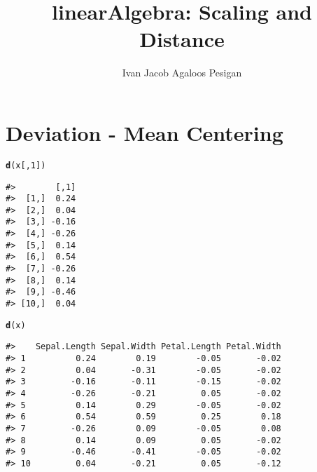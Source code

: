 \documentclass{article}\usepackage[]{graphicx}\usepackage[]{color}
\title{linearAlgebra: Scaling and Distance}
\author{Ivan Jacob Agaloos Pesigan}
\date{}
\makeatletter
\newcommand{\hlnum}[1]{\textcolor[rgb]{0.686,0.059,0.569}{#1}}%
\newcommand{\hlstd}[1]{\textcolor[rgb]{0.345,0.345,0.345}{#1}}%
\newcommand{\hlkwd}[1]{\textcolor[rgb]{0.737,0.353,0.396}{\textbf{#1}}}%
\newenvironment{kframe}{%
 \def\at@end@of@kframe{}%
 \ifinner\ifhmode%
  \def\at@end@of@kframe{\end{minipage}}%
  \begin{minipage}{\columnwidth}%
 \fi\fi%
 \def\FrameCommand##1{\hskip\@totalleftmargin \hskip-\fboxsep
 \colorbox{shadecolor}{##1}\hskip-\fboxsep
     \hskip-\linewidth \hskip-\@totalleftmargin \hskip\columnwidth}%
 \MakeFramed {\advance\hsize-\width
   \@totalleftmargin\z@ \linewidth\hsize
   \@setminipage}}%
 {\par\unskip\endMakeFramed%
 \at@end@of@kframe}
\newenvironment{knitrout}{}{} %
\makeatother
\begin{document}
\maketitle





\section*{Deviation - Mean Centering}









\begin{knitrout}
\color{fgcolor}\begin{kframe}
\begin{alltt}
\hlkwd{d}\hlstd{(x[,} \hlnum{1}\hlstd{])}
\end{alltt}
\begin{verbatim}
#>        [,1]
#>  [1,]  0.24
#>  [2,]  0.04
#>  [3,] -0.16
#>  [4,] -0.26
#>  [5,]  0.14
#>  [6,]  0.54
#>  [7,] -0.26
#>  [8,]  0.14
#>  [9,] -0.46
#> [10,]  0.04
\end{verbatim}
\end{kframe}
\end{knitrout}







\begin{knitrout}
\color{fgcolor}\begin{kframe}
\begin{alltt}
\hlkwd{d}\hlstd{(x)}
\end{alltt}
\begin{verbatim}
#>    Sepal.Length Sepal.Width Petal.Length Petal.Width
#> 1          0.24        0.19        -0.05       -0.02
#> 2          0.04       -0.31        -0.05       -0.02
#> 3         -0.16       -0.11        -0.15       -0.02
#> 4         -0.26       -0.21         0.05       -0.02
#> 5          0.14        0.29        -0.05       -0.02
#> 6          0.54        0.59         0.25        0.18
#> 7         -0.26        0.09        -0.05        0.08
#> 8          0.14        0.09         0.05       -0.02
#> 9         -0.46       -0.41        -0.05       -0.02
#> 10         0.04       -0.21         0.05       -0.12
\end{verbatim}
\end{kframe}
\end{knitrout}
\end{document}
